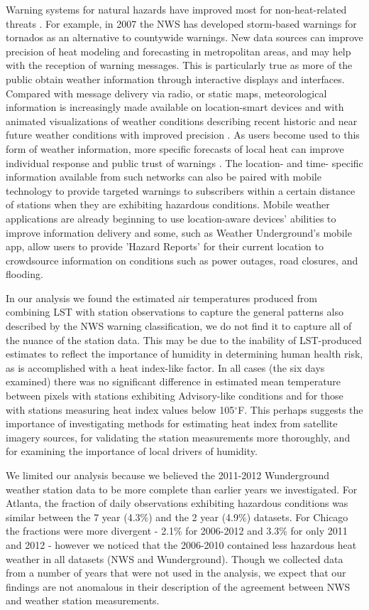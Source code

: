 \documentclass{ametsoc}
\begin{document}
Warning systems for natural hazards have improved most for non-heat-related threats \citep{sorensen}. For example, in 2007 the NWS has developed storm-based warnings for tornados as an alternative to countywide warnings. New data sources can improve precision of heat modeling and forecasting in metropolitan areas, and may help with the reception of warning messages. This is particularly true as more of the public obtain weather information through interactive displays and interfaces. Compared with message delivery via radio, or static maps, meteorological information is increasingly made available on location-smart devices and with animated visualizations of weather conditions describing recent historic and near future weather conditions with improved precision \citep{cellphones, casteel}. As users become used to this form of weather information, more specific forecasts of local heat can improve individual response and public trust of warnings \citep{savelli}. The location- and time- specific information available from such networks can also be paired with mobile technology to provide targeted warnings to subscribers within a certain distance of stations when they are exhibiting hazardous conditions. Mobile weather applications are already beginning to use location-aware devices' abilities to improve information delivery and some, such as Weather Underground's mobile app, allow users to provide 'Hazard Reports' for their current location to crowdsource information on conditions such as power outages, road closures, and flooding. 

In our analysis we found the estimated air temperatures produced from combining LST with station observations to capture the general patterns also described by the NWS warning classification, we do not find it to capture all of the nuance of the station data. This may be due to the inability of LST-produced estimates to reflect the importance of humidity in determining human health risk, as is accomplished with a heat index-like factor. In all cases (the six days examined) there was no significant difference in estimated mean temperature between pixels with stations exhibiting Advisory-like conditions and for those with stations measuring heat index values below 105$^\circ$F. This perhaps suggests the importance of investigating methods for estimating heat index from satellite imagery sources, for validating the station measurements more thoroughly, and for examining the importance of local drivers of humidity.

We limited our analysis because we believed the 2011-2012 Wunderground weather station data to be more complete than earlier years we investigated. For Atlanta, the fraction of daily observations exhibiting hazardous conditions was similar between the 7 year (4.3\%) and the 2 year (4.9\%)  datasets. For Chicago the fractions were more divergent - 2.1\% for 2006-2012 and 3.3\% for only 2011 and 2012 - however we noticed that the 2006-2010 contained less hazardous heat weather in all datasets (NWS and Wunderground). Though we collected data from a number of years that were not used in the analysis, we expect that our findings are not anomalous in their description of the agreement between NWS and weather station measurements.
\end{document}
